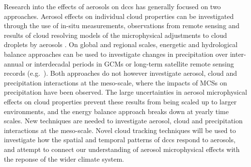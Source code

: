 Research into the effects of aerosols on \acrshort{dcc}s has generally focused on two approaches. Aerosol effects on individual cloud properties can be investigated through the use of in-situ measurements, observations from remote sensing and results of cloud resolving models of the microphysical adjustments to cloud droplets by aerosols \citep{khain2005aerosol}. 
On global and regional scales, energetic and hydrological balance approaches can be used to investigate changes in precipitation over inter-annual or interdecadal periods in GCMs or long-term satellite remote sensing records (e.g.\ \citet{allen_constraints_2002, held_robust_2006, muller_energetic_2011, richardson_drivers_2018}). 
Both approaches do not however investigate aerosol, cloud and precipitation interactions at the meso-scale, where the impacts of MCSs on precipitation have been observed. 
The large uncertainties in aerosol microphysical effects on cloud properties prevent these results from being scaled up to larger environments, and the energy balance approach breaks down at yearly time scales. 
New techniques are needed to investigate aerosol, cloud and precipitation interactions at the meso-scale. 
Novel cloud tracking techniques will be used to investigate how the spatial and temporal patterns of \acrshort{dcc}s respond to aerosols, and attempt to connect our understanding of aerosol microphysical effects with the reponse of the wider climate system.



